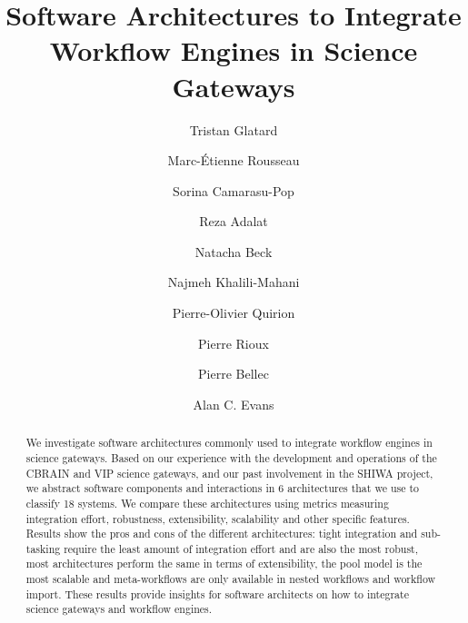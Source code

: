 \documentclass[preprint,3p,twocolumn]{elsarticle}
\begin{document}
\begin{frontmatter}



\title{Software Architectures to Integrate Workflow Engines in Science Gateways}


\author[mcgill,creatis]{Tristan Glatard}
\author[mcgill]{Marc-\'Etienne Rousseau}
\author[creatis]{Sorina Camarasu-Pop}

\author[mcgill]{Reza Adalat}
\author[mcgill]{Natacha Beck}
\author[mcgill]{Najmeh Khalili-Mahani}
\author[criugm]{Pierre-Olivier Quirion}
\author[mcgill]{Pierre Rioux}

\author[criugm]{Pierre Bellec}
\author[mcgill]{Alan C. Evans}

\address[mcgill]{McGill Centre for Integrative Neuroscience, Montreal Neurological Institute, McGill University, Canada.}
\address[creatis]{University of Lyon, CNRS, INSERM, CREATIS, Villeurbanne, France.}
\address[criugm]{Centre de Recherche de l'Institut de G\'eriatrie de Montr\'eal CRIUGM, Montreal, QC, Canada.}

\begin{abstract}
  We investigate software architectures commonly used to integrate workflow engines
  in science gateways. Based on our experience with the development
  and operations of the CBRAIN and VIP science gateways, and our past
  involvement in the SHIWA project, we abstract software components
  and interactions in 6 architectures that we use to classify 18
  systems. We compare these architectures using metrics measuring
  integration effort, robustness, extensibility, scalability and other
  specific features. Results show the pros and cons of the different
  architectures: tight integration and sub-tasking require the least
  amount of integration effort and are also the most robust, most
  architectures perform the same in terms of extensibility, the pool
  model is the most scalable and meta-workflows are only available in
  nested workflows and workflow import. These results provide insights
  for software architects on how to integrate science gateways and
  workflow engines.
\end{abstract}


\end{frontmatter}
\end{document}
